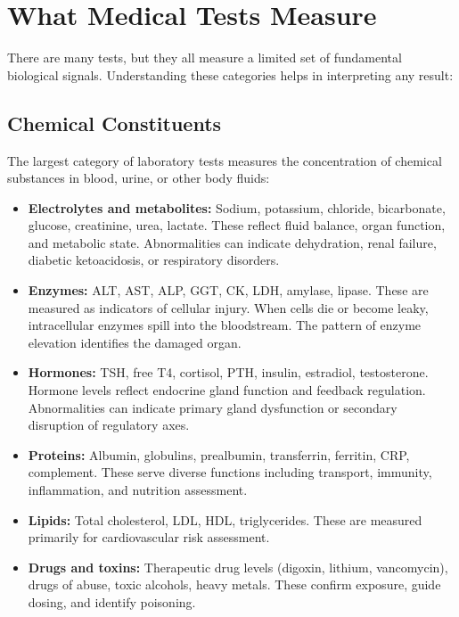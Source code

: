 \clearpage
\section{What Medical Tests Measure}

There are many tests, but they all measure a limited set of fundamental biological signals. Understanding these categories helps in interpreting any result:

\subsection{Chemical Constituents}

The largest category of laboratory tests measures the concentration of chemical substances in blood, urine, or other body fluids:

\begin{itemize}
    \item \textbf{Electrolytes and metabolites:} Sodium, potassium, chloride, bicarbonate, glucose, creatinine, urea, lactate. These reflect fluid balance, organ function, and metabolic state. Abnormalities can indicate dehydration, renal failure, diabetic ketoacidosis, or respiratory disorders.
    \item \textbf{Enzymes:} ALT, AST, ALP, GGT, CK, LDH, amylase, lipase. These are measured as indicators of cellular injury. When cells die or become leaky, intracellular enzymes spill into the bloodstream. The pattern of enzyme elevation identifies the damaged organ.
    \item \textbf{Hormones:} TSH, free T4, cortisol, PTH, insulin, estradiol, testosterone. Hormone levels reflect endocrine gland function and feedback regulation. Abnormalities can indicate primary gland dysfunction or secondary disruption of regulatory axes.
    \item \textbf{Proteins:} Albumin, globulins, prealbumin, transferrin, ferritin, CRP, complement. These serve diverse functions including transport, immunity, inflammation, and nutrition assessment.
    \item \textbf{Lipids:} Total cholesterol, LDL, HDL, triglycerides. These are measured primarily for cardiovascular risk assessment.
    \item \textbf{Drugs and toxins:} Therapeutic drug levels (digoxin, lithium, vancomycin), drugs of abuse, toxic alcohols, heavy metals. These confirm exposure, guide dosing, and identify poisoning.
\end{itemize}

